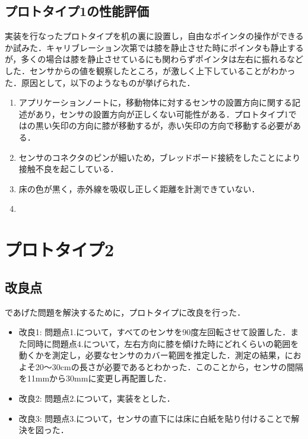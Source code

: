 \subsection{プロトタイプ1の性能評価}
実装を行なったプロトタイプを机の裏に設置し，自由なポインタの操作ができるか試みた．キャリブレーション次第では膝を静止させた時にポインタも静止するが，多くの場合は膝を静止させているにも関わらずポインタは左右に振れるなどした．センサからの値を観察したところ，が激しく上下していることがわかった．原因として，以下のようなものが挙げられた．
\begin{enumerate}
	\item アプリケーションノートに，移動物体に対するセンサの設置方向に関する記述があり，センサの設置方向が正しくない可能性がある．プロトタイプ1ではの黒い矢印の方向に膝が移動するが，赤い矢印の方向で移動する必要がある．
	\item センサのコネクタのピンが細いため，ブレッドボード接続をしたことにより接触不良を起こしている．
	\item 床の色が黒く，赤外線を吸収し正しく距離を計測できていない．
	\item {}
\end{enumerate}
\section{プロトタイプ2}
\subsection{改良点}
であげた問題を解決するために，プロトタイプに改良を行った．
\begin{itemize}
	\item{改良1: } 問題点1.について，すべてのセンサを90度左回転させて設置した．また同時に問題点4.について，左右方向に膝を傾けた時にどれくらいの範囲を動くかを測定し，必要なセンサのカバー範囲を推定した．測定の結果，におよそ20〜30\si{cm}の長さが必要であるとわかった．このことから，センサの間隔を11\si{mm}から30\si{mm}に変更し再配置した．
	\item{改良2: } 問題点2.について，実装をとした．
	\item{改良3: } 問題点3.について，センサの直下には床に白紙を貼り付けることで解決を図った．
\end{itemize}


